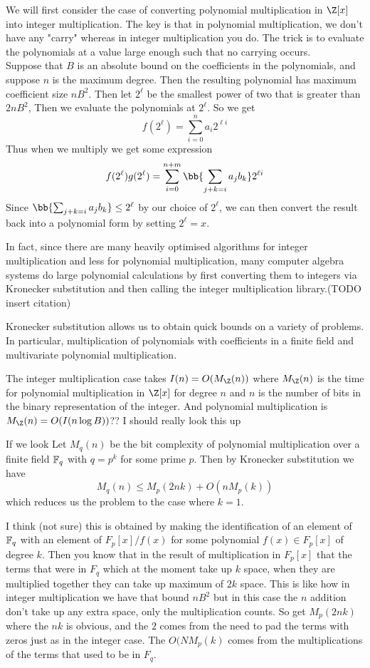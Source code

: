 We will first consider the case of converting polynomial multiplication in $\Z[x]$ into integer multiplication. The key is that in polynomial multiplication, we don't have any "carry" whereas in integer multiplication you do. The trick is to evaluate the polynomials at a value large enough such that no carrying occurs.\\
Suppose that $B$ is an absolute bound on the coefficients in the polynomials, and suppose $n$ is the maximum degree. Then the resulting polynomial has maximum coefficient size $nB^2$. Then let $2^\ell$ be the smallest power of two that is greater than $2nB^2$, Then we evaluate the polynomials at $2^\ell$. So we get
\[
    f(2^\ell) = \sum^n_{i = 0} a_i 2^{\ell i}
\]
Thus when we multiply we get some expression 
\[
    f(2^\ell)g(2^\ell) = \sum^{n+m}_{i=0} \bb{\sum_{j + k = i} a_jb_k}2^{\ell i}  
\]
Since $\bb{\sum_{j + k = i}a_j b_k} \leq 2^{\ell}$ by our choice of $2^\ell$, we can then convert the result back into a polynomial form by setting $2^\ell = x$. 

In fact, since there are many heavily optimised algorithms for integer multiplication and less for polynomial multiplication, many computer algebra systems do large polynomial calculations by first converting them to integers via Kronecker substitution and then calling the integer multiplication library.(TODO insert citation)

Kronecker substitution allows us to obtain quick bounds on a variety of problems. In particular, multiplication of polynomials with coefficients in a finite field and multivariate polynomial multiplication. 

The integer multiplication case takes $I(n) = O(M_\Z(n))$ where $M_\Z(n)$ is the time for polynomial multiplication in $\Z[x]$ for degree $n$ and $n$ is the number of bits in the binary representation of the integer. And polynomial multiplication is $M_\Z(n) = O(I(n\log B))$?? I should really look this up

If we look 
Let $M_q(n)$ be the bit complexity of polynomial multiplication over a finite field $\mathbb{F}_q$ with $q = p^k$ for some prime $p$. Then by Kronecker substitution we have
\[
    M_q(n) \leq M_p(2nk) + O(n M_p(k))
\]
which reduces us the problem to the case where $k = 1$.

I think (not sure) this is obtained by making the identification of an element of $\mathbb{F}_q$ with an element of $F_p[x]/f(x)$ for some polynomial $f(x) \in F_p[x]$ of degree $k$. Then you know that in the result of multiplication in $F_p[x]$ that the terms that were in $F_q$ which at the moment take up $k$ space, when they are multiplied together they can take up  maximum of $2k$ space. This is like how in integer multiplication we have that bound $nB^2$ but in this case the $n$ addition don't take up any extra space, only the multiplication counts. So get $M_p(2nk)$ where the $nk$ is obvious, and the $2$ comes from the need to pad the terms with zeros just as in the integer case. The $O(N M_p(k)$ comes from the multiplications of the terms that used to be in $F_q$.

